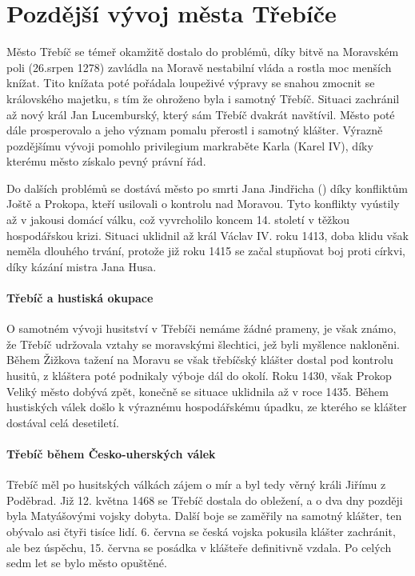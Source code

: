 \documentclass[a4paper,oneside,12p]{report}
\begin{document}
\chapter{Pozdější vývoj města Třebíče}

Město Třebíč se témeř okamžitě dostalo do problémů, díky bitvě na Moravském poli (26.srpen 1278) zavládla na Moravě nestabilní vláda a rostla moc menších knížat.
Tito knížata poté pořádala loupeživé výpravy se snahou zmocnit se královského majetku, s tím že ohroženo byla i samotný Třebíč. %
Situaci zachránil až nový král Jan Lucemburský, který sám Třebíč dvakrát navštívil.
Město poté dále prosperovalo a jeho význam pomalu přerostl i samotný klášter.
Výrazně pozdějšímu vývoji pomohlo privilegium markraběte Karla (Karel IV), díky kterému město získalo pevný právní řád.

Do dalších problémů se dostává město po smrti Jana Jindřicha () díky konfliktům Joště a Prokopa, kteří usilovali o kontrolu nad Moravou.
Tyto konflikty vyústily až v jakousi domácí válku, což vyvrcholilo koncem 14. století v těžkou hospodářskou krizi.
Situaci uklidnil až král Václav IV. roku 1413, doba klidu však neměla dlouhého trvání, protože již roku 1415 se začal stupňovat boj proti církvi, díky kázání mistra Jana Husa. %

\subsubsection{Třebíč a hustiská okupace}

O samotném vývoji husitství v Třebíči nemáme žádné prameny, je však známo, že Třebíč udržovala vztahy se moravskými šlechtici, jež byli myšlence nakloněni.
Během Žižkova tažení na Moravu se však třebíčský klášter dostal pod kontrolu husitů, z kláštera poté podnikaly výboje dál do okolí.
Roku 1430, však Prokop Veliký město dobývá zpět, konečně se situace uklidnila až v roce 1435.
Během hustiských válek došlo k výraznému hospodářskému úpadku, ze kterého se klášter dostával celá desetiletí. %

\subsubsection{Třebíč během Česko-uherských válek}

Třebíč měl po husitských válkách zájem o mír a byl tedy věrný králi Jiřímu z Poděbrad.
Již 12. května 1468 se Třebíč dostala do obležení, a o dva dny později byla Matyášovými vojsky dobyta.
Další boje se zaměřily na samotný klášter, ten obývalo asi čtyři tisíce lidí.
6. června se česká vojska pokusila klášter zachránit, ale bez úspěchu, 15. června se posádka v klášteře definitivně vzdala.
Po celých sedm let se bylo město opuštěné. %
\end{document}
